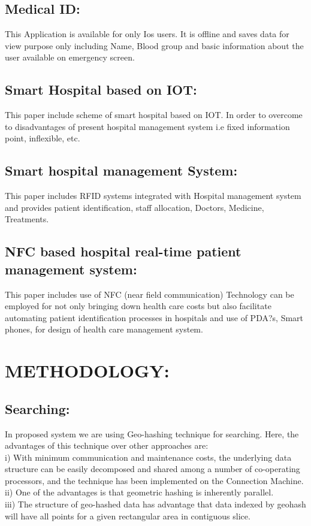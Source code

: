 \documentclass[12pt,]{article}
\begin{document}
\subsection{Medical ID:}
This Application is available for only Ios users. It is offline and saves data for view purpose only including Name, Blood group and basic information about the user available on emergency screen.
\subsection{Smart Hospital based on IOT:}
This paper include scheme of smart hospital based on IOT. In order to overcome to disadvantages of present hospital management system i.e fixed information point, inflexible, etc.
\subsection{Smart hospital management System:}
This paper includes RFID systems integrated with Hospital management system and provides patient identification, staff allocation, Doctors, Medicine, Treatments.
\subsection{NFC based hospital real-time patient management system:}
This paper includes use of NFC (near field communication) Technology can be employed for not only bringing down health care costs but also facilitate automating patient identification processes in hospitals and use of PDA?s, Smart phones, for design of health care management system\cite{nagykaldi2003diabetes}.
\section{METHODOLOGY:}
\subsection{Searching:}
In proposed system we are using Geo-hashing technique for searching. Here, the advantages of this technique over other approaches are:\\
i) With minimum communication and maintenance costs, the underlying data structure can be easily decomposed and shared among a number of co-operating processors, and the technique has been implemented on the Connection Machine\cite{sukovic2009surgical}.\\
 ii) One of the advantages is that geometric hashing is inherently parallel.\\
iii) The structure of geo-hashed data has advantage that data indexed by geohash will have all points for a given rectangular area in contiguous slice.
\end{document}
